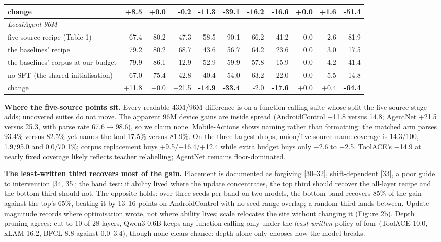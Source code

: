 \documentclass{article}
\begin{document}
\begin{table}[htbp]
{\begin{tabular}{lrrrrrrrrrr}
change & +8.5 & +0.0 & -0.2 & \textbf{-11.3} & \textbf{-39.1} & -16.2 & \textbf{-16.6} & +0.0 & +1.6 & \textbf{-51.4} \\
\midrule
\multicolumn{11}{l}{\emph{LocalAgent-96M}} \\
\midrule
five-source recipe (Table 1) & 67.4 & 80.2 & 47.3 & 58.5 & 90.1 & 66.2 & 41.2 & 0.0 & 2.6 & 81.9 \\
the baselines' recipe & 79.2 & 80.2 & 68.7 & 43.6 & 56.7 & 64.2 & 23.6 & 0.0 & 3.0 & 17.5 \\
the baselines' corpus at our budget & 79.9 & 86.1 & 12.9 & 52.9 & 59.9 & 57.8 & 15.9 & 0.0 & 4.2 & 41.4 \\
no SFT (the shared initialisation) & 67.0 & 75.4 & 42.8 & 40.4 & 54.0 & 63.2 & 22.0 & 0.0 & 5.5 & 14.8 \\
change & +11.8 & +0.0 & +21.5 & \textbf{-14.9} & \textbf{-33.4} & -2.0 & \textbf{-17.6} & +0.0 & +0.4 & \textbf{-64.4} \\
\bottomrule
\end{tabular}}
\end{table}


\textbf{Where the five-source points sit.} Every readable 43M/96M difference is on a
function-calling suite whose split the five-source stage adds; uncovered suites do not move.
The apparent 96M device gains are inside spread (AndroidControl +11.8 versus 14.8;
AgentNet +21.5 versus 25.3, with parse rate 67.6$\rightarrow$98.6), so we claim none. Mobile-Actions
shows naming rather than formatting: the matched arm parses 93.4\% versus 82.5\% yet names the
tool 17.5\% versus 81.9\%. On the three largest drops, union/five-source name coverage is
14.3/100, 1.9/95.0 and 0.0/70.1\%; corpus replacement buys +9.5/+16.4/+12.4 while extra
budget buys only $-$2.6 to +2.5. ToolACE's $-$14.9 at nearly fixed coverage likely
reflects teacher relabelling; AgentNet remains floor-dominated.




\textbf{The least-written third recovers most of the gain.} Placement is documented as forgiving [30--32], shift-dependent [33], a poor guide to intervention [34, 35]; the band test: if ability lived where the update concentrates, the top third should recover the all-layer recipe and the bottom third should not. The opposite holds: over three seeds per band on two models, the bottom band recovers 85\% of the gain against the top's 65\%, beating it by 13--16 points on AndroidControl with no seed-range overlap; a random third lands between. Update magnitude records where optimisation wrote, not where ability lives; scale relocates the site without changing it (Figure 2b). Depth pruning agrees: cut to 10 of 28 layers, Qwen3-0.6B keeps any function calling only under the \emph{least-written} policy of four (ToolACE 10.0, xLAM 16.2, BFCL 8.8 against 0.0--3.4), though none clears chance: depth alone only chooses how the model breaks.
\end{document}
